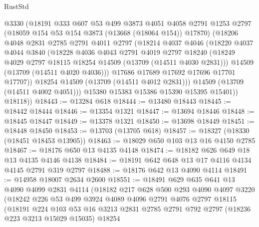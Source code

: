 \begin{lexlean}{RustStd}
\begin{coremodule}
            @3330
            (@18191
              @333
              @607
              @53
              @499
              @3873
              @4051
              @4058
              @2791
              @1253
              @2797
              (@18059 @154 @53 @154 @3873 (@13668 (@18064 @154)) @17870)
              (@18206
                @4048
                @2831
                @2785
                @2791
                @4011
                @2797
                (@18214
                  @4037
                  @4046
                  (@18220
                    @4037
                    @4044
                    @3840
                    (@18228
                      @4036
                      @4043
                      @2791
                      @4019
                      @2797
                      @18240
                      (@18249 @4029 @2797 @18115 @18254 @14509 (@13709 (@14511 @4030 @2831)))
                      @14509
                      (@13709 (@14511 @4020 @4036)))
                    @17686
                    @17689
                    @17692
                    @17696
                    @17701
                    @17707))
                @18254
                @14509
                (@13709 (@14511 @4012 @2831)))
              @14509
              (@13709 (@14511 @4002 @4051)))
            @15380
            @15383
            @15386
            @15390
            @15395
            @15401))
        @18118))
@18443 := @13284 @618
@18444 := @13480 @18443
@18445 := @18442 @18444
@18446 := @13354 @1321
@18447 := @13694 @18446
@18448 := @18445 @18447
@18449 := @13378 @1321
@18450 := @13698 @18449
@18451 := @18448 @18450
@18453 := @13703 (@13705 @618)
@18457 := @18327 (@18330 (@18451 @18453 @13905))
@18463 := @18029 @650 @103 @13 @16 @4150 @2785
@18467 := @18176 @650 @13 @4135 @4148
@18474 := @18182 @626 @649 @18 @13 @4135 @4146 @4138
@18484 := @18191 @642 @648 @13 @17 @4116 @4134 @4145 @2791 @319 @2797
@18488 := @18176 @642 @13 @4090 @4114
@18491 := @14958 @18007 @2634 @2600
@18551 := @18491
    @629
    @635
    @641
    @13
    @4090
    @4099
    @2831
    @4114
    (@18182
      @217
      @628
      @500
      @293
      @4090
      @4097
      @3220
      (@18242
        @226
        @53
        @499
        @3924
        @4089
        @4096
        @2791
        @4076
        @2797
        @18115
        (@18191
          @224
          @103
          @53
          @16
          @3213
          @2831
          @2785
          @2791
          @792
          @2797
          (@18236 @223 @3213 @15029 @15035)
          @18254

\end{coremodule}
\end{lexlean}

